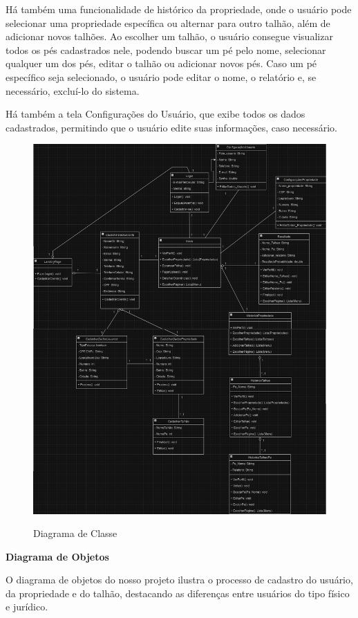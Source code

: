 Há também uma funcionalidade de histórico da propriedade, onde o usuário pode selecionar uma propriedade específica ou alternar para outro talhão, além de adicionar novos talhões. Ao escolher um talhão, o usuário consegue visualizar todos os pés cadastrados nele, podendo buscar um pé pelo nome, selecionar qualquer um dos pés, editar o talhão ou adicionar novos pés. Caso um pé específico seja selecionado, o usuário pode editar o nome, o relatório e, se necessário, excluí-lo do sistema.

Há também a tela Configurações do Usuário, que exibe todos os dados cadastrados, permitindo que o usuário edite suas informações, caso necessário.

\begin{figure}[H]
\centering
\caption{Diagrama de Classe}
\includegraphics[width=0.7\linewidth]{Illustrations/diagramaClasse.png}
\label{fig:diagrama-classe}
\end{figure}

\textbf{Diagrama de Objetos}

O diagrama de objetos do nosso projeto  ilustra o processo de cadastro do usuário, da propriedade e do talhão, destacando as diferenças entre usuários do tipo físico e jurídico.

